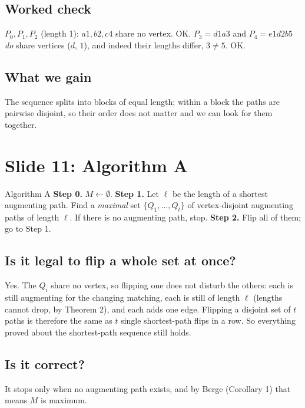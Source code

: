 \documentclass[11pt,a4paper]{article}
\begin{document}
\subsection*{Worked check}
$P_0,P_1,P_2$ (length 1): $a1,b2,c4$ share no vertex. OK. $P_3=d1a3$ and $P_4=e1d2b5$ \emph{do} share vertices ($d$, $1$), and indeed their lengths differ, $3\ne5$. OK.

\subsection*{What we gain}
The sequence splits into blocks of equal length; within a block the paths are pairwise disjoint, so their order does not matter and we can look for them together.

\section{Slide 11: Algorithm A}
\begin{thm}{Algorithm A}
\textbf{Step 0.} $M\gets\emptyset$.\quad
\textbf{Step 1.} Let $\ell$ be the length of a shortest augmenting path. Find a \emph{maximal} set $\{Q_1,\dots,Q_t\}$ of vertex-disjoint augmenting paths of length $\ell$. If there is no augmenting path, stop.\quad
\textbf{Step 2.} Flip all of them; go to Step 1.
\end{thm}
\subsection*{Is it legal to flip a whole set at once?}
Yes. The $Q_i$ share no vertex, so flipping one does not disturb the others: each is still augmenting for the changing matching, each is still of length $\ell$ (lengths cannot drop, by Theorem 2), and each adds one edge. Flipping a disjoint set of $t$ paths is therefore the same as $t$ single shortest-path flips in a row. So everything proved about the shortest-path sequence still holds.

\subsection*{Is it correct?}
It stops only when no augmenting path exists, and by Berge (Corollary 1) that means $M$ is maximum.
\end{document}
